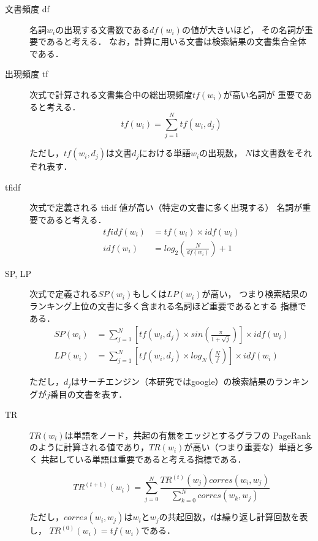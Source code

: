 \documentclass[japanese]{jnlp_1.4}
\begin{document}
\begin{description}
\item[文書頻度 df] 名詞$w_i$の出現する文書数である$df(w_i)$の値が大きいほど，
  その名詞が重要であると考える．
  なお，計算に用いる文書は検索結果の文書集合全体である．
\item[出現頻度 tf] 次式で計算される文書集合中の総出現頻度$tf(w_i)$が高い名詞が
  重要であると考える．
  \begin{equation}
    tf(w_i) = \sum_{j=1}^{N} tf(w_i,d_j) \label{eqn:tf}
  \end{equation}
  
  ただし，$tf(w_i,d_j)$は文書$d_j$における単語$w_i$の出現数，
  $N$は文書数をそれぞれ表す．

\item[tfidf] 次式で定義される tfidf 値が高い（特定の文書に多く出現する）
  名詞が重要であると考える．
  \begin{align}
    tfidf(w_{i}) &= tf(w_i) \times idf(w_i)\\
    idf(w_i) &= log_{2} \left( \frac{N}{df(w_{i})} \right) + 1
  \end{align}

\item[SP, LP \cite{Narita03}] 次式で定義される$SP(w_i)$もしくは$LP(w_i)$が高い，
  つまり検索結果のランキング上位の文書に多く含まれる名詞ほど重要であるとする
  指標である．
  \begin{align}
    SP(w_{i}) &= \sum_{j=1}^{N} 
    \left[
      tf(w_{i},d_{j}) \times sin\left({\frac{\pi}{1+\sqrt{j}}}\right)
    \right] \times idf(w_{i}) \\
    LP(w_{i}) &= \sum_{j=1}^{N} 
    \left[
      tf(w_{i},d_{j}) \times log_{N}\left(\frac{N}{j}\right)
    \right] \times idf(w_{i})
  \end{align}
  
  ただし，$d_j$はサーチエンジン（本研究ではgoogle）の検索結果のランキングが$j$番目の文書を表す．

\item[TR \cite{Gelgi07}] $TR(w_i)$は単語をノード，共起の有無をエッジとするグラフの
  PageRankのように計算される値であり，$TR(w_i)$が高い（つまり重要な）単語と多く
  共起している単語は重要であると考える指標である．
  
  \begin{equation} 
    TR^{(t+1)}(w_i) = 
    \sum_{j = 0}^{N} \frac{TR^{(t)}(w_{j}) corres(w_i,w_j)}{\sum_{k = 0}^{N} corres(w_k,w_j)} 
    \label{eq:TR}
  \end{equation}
  
  ただし，{$corres(w_i,w_j)$}は{$w_i$}と{$w_j$}の共起回数，{$t$}は繰り返し計算回数を表し，
  {$TR^{(0)}(w_i)=tf(w_i)$}である．

\end{description}
\end{document}
